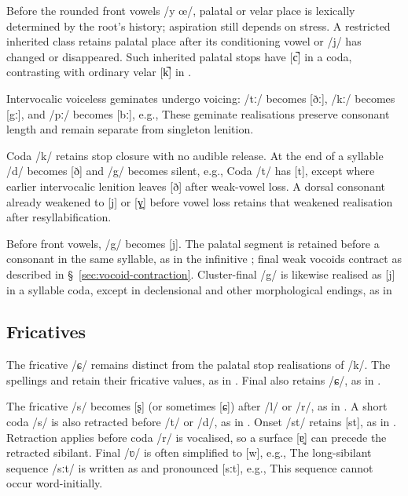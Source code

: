 Before the rounded front vowels /y œ/, palatal or velar place is lexically determined by the root's history; aspiration still depends on stress. A restricted inherited class retains palatal place after its conditioning vowel or /j/ has changed or disappeared. Such inherited palatal stops have [c̚] in a coda, contrasting with ordinary velar [k̚] in .

Intervocalic voiceless geminates undergo voicing: /tː/ becomes [ðː], /kː/ becomes [gː], and /pː/ becomes [bː], e.g.,  These geminate realisations preserve consonant length and remain separate from singleton lenition.

Coda /k/ retains stop closure with no audible release. At the end of a syllable /d/ becomes [ð] and /g/ becomes silent, e.g.,   Coda /t/ has [t], except where earlier intervocalic lenition leaves [ð] after weak-vowel loss. A dorsal consonant already weakened to [j] or [ɣ̞] before vowel loss retains that weakened realisation after resyllabification.

Before front vowels, /g/ becomes [j]. The palatal segment is retained before a consonant in the same syllable, as in the infinitive ; final weak vocoids contract as described in \S~\ref{sec:vocoid-contraction}. Cluster-final /g/ is likewise realised as [j] in a syllable coda, except in declensional and other morphological endings, as in 

\subsection{Fricatives}

The fricative /ɕ/ remains distinct from the palatal stop realisations of /k/. The spellings  and  retain their fricative values, as in . Final  also retains /ɕ/, as in .

The fricative /s/ becomes [ʂ] (or sometimes [ɕ]) after /l/ or /r/, as in . A short coda /s/ is also retracted before /t/ or /d/, as in . Onset /st/ retains [st], as in . Retraction applies before coda /r/ is vocalised, so a surface [ɐ̯] can precede the retracted sibilant. Final /ʋ/ is often simplified to [w], e.g.,  The long-sibilant sequence /sːt/ is written as  and pronounced [sːt], e.g.,  This sequence cannot occur word-initially.

